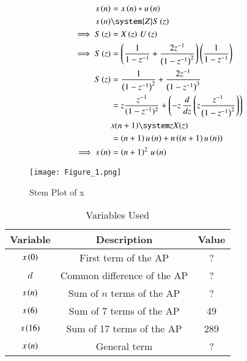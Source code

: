 \documentclass[journal,12pt,twocolumn]{IEEEtran}
\theoremstyle{remark}
\begin{document}
\begin{align}
   s\brak{n}&=x\brak{n}*u\brak{n}\\
   s\brak{n}&\system{Z}S\brak{z}\notag\\
   \implies S\brak{z}&=X\brak{z}\,U\brak{z}\\
   \implies S\brak{z}&=\brak{\frac{1}{1-z^{-1}}+\frac{2z^{-1}}{\brak{1-z^{-1}}^2}}\brak{\frac{1}{1-z^{-1}}}\\
   S\brak{z}&=\frac{1}{\brak{1-z^{-1}}^2}+\frac{2z^{-1}}{\brak{1-z^{-1}}^3}\\
   &=z\frac{z^{-1}}{({1-z^{-1}})^2}+\brak{-z\,\frac{d}{dz}\brak{z\frac{z^{-1}}{\brak{1-z^{-1}}^2}}}\\
   &x(n+1) \system zX(z)\notag\\
   &=\brak{n+1}u\brak{n}+n\brak{\brak{n+1}u\brak{n}}\\
   \implies s\brak{n}&=\brak{n+1}^2\,u\brak{n}
\end{align}
\begin{figure}[h!]
   \centering
   \texttt{[image: Figure\_1.png]}
   \caption{Stem Plot of x}
   \label{stemplot}
\end{figure}
\begin{table}[h!]    
   \begin{tabular}[12pt]{ |c| c| c|}
   \hline
   \textbf{Variable} & \textbf{Description} &\textbf{Value}\\ 
   \hline
   $x\left(0\right)$ & First term of the AP &?\\
   \hline 
   $d$ & Common difference of the AP& ?\\
   \hline
   $s\left(n\right)$ & Sum of $n$ terms of the AP& ?\\
   \hline
   $s\left(6\right)$& Sum of 7 terms of the AP& 49\\
   \hline
   $s\left(16\right)$& Sum of 17 terms of the AP&289\\
   \hline
   $x\left(n\right)$ & General term& ?\\
   \hline   
   \end{tabular}
   \caption{Variables Used}
   \label{tab10.5.3.9.1}
\end{table}
\end{document}
